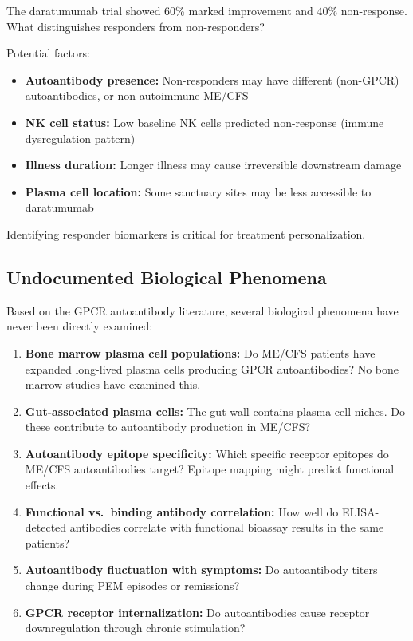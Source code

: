 \begin{open_question}
The daratumumab trial showed 60\% marked improvement and 40\% non-response. What distinguishes responders from non-responders?

Potential factors:
\begin{itemize}
    \item \textbf{Autoantibody presence:} Non-responders may have different (non-GPCR) autoantibodies, or non-autoimmune ME/CFS
    \item \textbf{NK cell status:} Low baseline NK cells predicted non-response (immune dysregulation pattern)
    \item \textbf{Illness duration:} Longer illness may cause irreversible downstream damage
    \item \textbf{Plasma cell location:} Some sanctuary sites may be less accessible to daratumumab
\end{itemize}

Identifying responder biomarkers is critical for treatment personalization.
\end{open_question}

\subsection{Undocumented Biological Phenomena}

Based on the GPCR autoantibody literature, several biological phenomena have never been directly examined:

\begin{enumerate}
    \item \textbf{Bone marrow plasma cell populations:} Do ME/CFS patients have expanded long-lived plasma cells producing GPCR autoantibodies? No bone marrow studies have examined this.
    \item \textbf{Gut-associated plasma cells:} The gut wall contains plasma cell niches. Do these contribute to autoantibody production in ME/CFS?
    \item \textbf{Autoantibody epitope specificity:} Which specific receptor epitopes do ME/CFS autoantibodies target? Epitope mapping might predict functional effects.
    \item \textbf{Functional vs.\ binding antibody correlation:} How well do ELISA-detected antibodies correlate with functional bioassay results in the same patients?
    \item \textbf{Autoantibody fluctuation with symptoms:} Do autoantibody titers change during PEM episodes or remissions?
    \item \textbf{GPCR receptor internalization:} Do autoantibodies cause receptor downregulation through chronic stimulation?
\end{enumerate}

